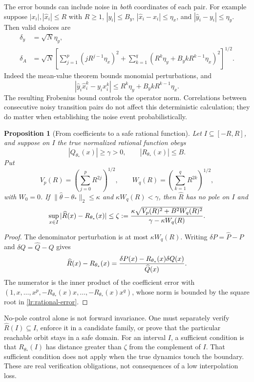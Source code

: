 \documentclass[11pt]{article}
\newtheorem{proposition}[theorem]{Proposition}
\theoremstyle{definition}
\begin{document}
The error bounds can include noise in \emph{both} coordinates of each
pair. For example suppose $|x_i|,|\widehat x_i|\leq R$ with $R\geq1$,
$|y_i|\leq B_y$, $|\widehat x_i-x_i|\leq\eta_x$, and
$|\widehat y_i-y_i|\leq\eta_y$. Then valid choices are
\begin{align}
 \delta_y&=\sqrt N\eta_y,\\
 \delta_A&=\sqrt N\left[
 \sum_{j=1}^{p}(jR^{j-1}\eta_x)^2+
 \sum_{k=1}^{q}(R^k\eta_y+B_y kR^{k-1}\eta_x)^2
 \right]^{1/2}.
 \label{lr:design-noise}
\end{align}
Indeed the mean-value theorem bounds monomial perturbations, and
\[
 |\widehat y_i\widehat x_i^k-y_ix_i^k|
 \leq R^k\eta_y+B_y kR^{k-1}\eta_x.
\]
The resulting Frobenius bound controls the operator norm. Correlations
between consecutive noisy transition pairs do not affect this
deterministic calculation; they do matter when establishing the noise
event probabilistically.

\begin{proposition}[From coefficients to a safe rational function]
\label{lr:safe-domain}
Let $I\subseteq[-R,R]$, and suppose on $I$ the true normalized
rational function obeys
\[
 |Q_{\theta_*}(x)|\geq\gamma>0,
 \qquad |R_{\theta_*}(x)|\leq B.
\]
Put
\[
 V_p(R)=\left(\sum_{j=0}^{p}R^{2j}\right)^{1/2},
 \qquad W_q(R)=\left(\sum_{k=1}^{q}R^{2k}\right)^{1/2},
\]
with $W_0=0$. If $\|\widehat\theta-\theta_*\|_2\leq\kappa$
and $\kappa W_q(R)<\gamma$, then $\widehat R$ has no pole on $I$
and
\begin{equation}
 \sup_{x\in I}|\widehat R(x)-R_{\theta_*}(x)|
 \leq\zeta:={\kappa\sqrt{V_p(R)^2+B^2W_q(R)^2}
                       \over\gamma-\kappa W_q(R)}.
 \label{lr:rational-error}
\end{equation}
\end{proposition}
\begin{proof}
The denominator perturbation is at most $\kappa W_q(R)$.
Writing $\delta P=\widehat P-P$ and $\delta Q=\widehat Q-Q$ gives
\[
 \widehat R(x)-R_{\theta_*}(x)
 ={\delta P(x)-R_{\theta_*}(x)\delta Q(x)\over\widehat Q(x)}.
\]
The numerator is the inner product of the coefficient error with
$(1,x,\ldots,x^p,-R_{\theta_*}(x)x,\ldots,-R_{\theta_*}(x)x^q)$,
whose norm is bounded by the
square root in \eqref{lr:rational-error}.
\end{proof}

No-pole control alone is not forward invariance. One must separately
verify $\widehat R(I)\subseteq I$, enforce it in a candidate family, or
prove that the particular reachable orbit stays in a safe domain.
For an interval $I$, a sufficient condition is that $R_{\theta_*}(I)$ has distance
greater than $\zeta$ from the complement of $I$. That sufficient condition
does not apply when the true dynamics touch the boundary. These are real
verification obligations, not consequences of a low interpolation loss.
\end{document}
